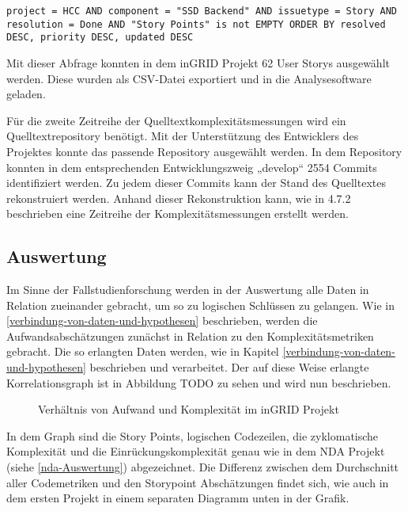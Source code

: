 \lstset{language=SQL}
\begin{lstlisting}
project = HCC AND component = "SSD Backend" AND issuetype = Story AND resolution = Done AND "Story Points" is not EMPTY ORDER BY resolved DESC, priority DESC, updated DESC
\end{lstlisting}

Mit dieser Abfrage konnten in dem inGRID Projekt 62 User Storys
ausgewählt werden. Diese wurden als \ac{CSV}-Datei exportiert und in die
Analysesoftware geladen.

Für die zweite Zeitreihe der Quelltextkomplexitätsmessungen wird ein
Quelltextrepository benötigt. Mit der Unterstützung des Entwicklers des
Projektes konnte das passende Repository ausgewählt werden. In dem
Repository konnten in dem entsprechenden Entwicklungszweig „develop``
2554 Commits identifiziert werden. Zu jedem dieser Commits kann der
Stand des Quelltextes rekonstruiert werden. Anhand dieser Rekonstruktion
kann, wie in 4.7.2 beschrieben eine Zeitreihe der Komplexitätsmessungen
erstellt werden.

\subsection{Auswertung}\label{ingrid-Auswertung}

Im Sinne der Fallstudienforschung werden in der Auswertung alle Daten in
Relation zueinander gebracht, um so zu logischen Schlüssen zu gelangen.
Wie in \ref{verbindung-von-daten-und-hypothesen} beschrieben, werden die Aufwandsabschätzungen zunächst in
Relation zu den Komplexitätsmetriken gebracht. Die so erlangten Daten
werden, wie in Kapitel \ref{verbindung-von-daten-und-hypothesen} beschrieben und verarbeitet. Der auf diese Weise
erlangte Korrelationsgraph ist in Abbildung TODO zu sehen und wird nun
beschrieben.

\begin{figure}\label{ingrid-graph}
  \begin{center}
      
  \end{center}
  \caption{Verhältnis von Aufwand und Komplexität im inGRID Projekt}
\end{figure}

In dem Graph sind die Story Points, logischen Codezeilen, die
zyklomatische Komplexität und die Einrückungskomplexität genau wie in
dem NDA Projekt (siehe \ref{nda-Auswertung}) abgezeichnet. Die Differenz zwischen dem
Durchschnitt aller Codemetriken und den Storypoint Abschätzungen findet
sich, wie auch in dem ersten Projekt in einem separaten Diagramm unten
in der Grafik.

